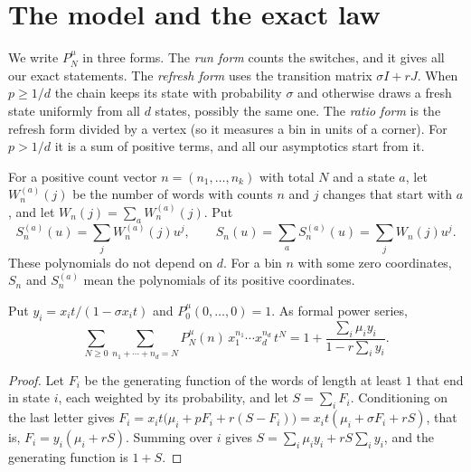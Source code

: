 \section{The model and the exact law}\label{sec:multistate-model}

We write $P^\mu_N$ in three forms. The \emph{run form} counts the switches,
and it gives all our exact statements. The \emph{refresh form} uses the
transition matrix $\sigma I+rJ$. When $p\ge1/d$ the chain keeps its state with
probability $\sigma$ and otherwise draws a fresh state uniformly from all $d$
states, possibly the same one. The \emph{ratio form} is the refresh form
divided by a vertex (so it measures a bin in units of a corner). For $p>1/d$ it is a sum of positive terms, and all our
asymptotics start from it.

For a positive count vector $n=(n_1,\ldots,n_k)$ with total $N$ and a state
$a$, let $W^{(a)}_n(j)$ be the number of words with counts $n$ and $j$ changes
that start with $a$, and let $W_n(j)=\sum_aW^{(a)}_n(j)$. Put
\[
S^{(a)}_n(u)=\sum_jW^{(a)}_n(j)u^j,\qquad
S_n(u)=\sum_aS^{(a)}_n(u)=\sum_jW_n(j)u^j .
\]
These polynomials do not depend on $d$. For a bin $n$ with some zero
coordinates, $S_n$ and $S^{(a)}_n$ mean the polynomials of its positive
coordinates.

\begin{proposition}\label{prop:dgf}
Put $y_i=x_it/(1-\sigma x_it)$ and $P^\mu_0(0,\ldots,0)=1$. As formal power
series,
\[
\sum_{N\ge0}\sum_{n_1+\cdots+n_d=N}P^\mu_N(n)\,x_1^{n_1}\cdots x_d^{n_d}\,t^N
=1+\frac{\sum_i\mu_iy_i}{1-r\sum_iy_i}.
\]
\end{proposition}

\begin{proof}
Let $F_i$ be the generating function of the words of length at least $1$ that
end in state $i$, each weighted by its probability, and let $S=\sum_iF_i$.
Conditioning on the last letter gives
$F_i=x_it\bigl(\mu_i+pF_i+r(S-F_i)\bigr)=x_it(\mu_i+\sigma F_i+rS)$, that is,
$F_i=y_i(\mu_i+rS)$. Summing over $i$ gives
$S=\sum_i\mu_iy_i+rS\sum_iy_i$, and the generating function is $1+S$.
\end{proof}


